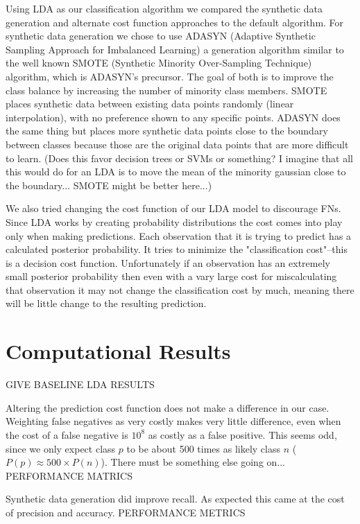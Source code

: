 \documentclass{article}
\begin{document}
Using LDA as our classification algorithm we compared the synthetic data generation and alternate cost function approaches to the default algorithm.
For synthetic data generation we chose to use ADASYN (Adaptive Synthetic Sampling Approach for Imbalanced Learning) a generation algorithm similar to the well known SMOTE (Synthetic Minority Over-Sampling Technique) algorithm, which is ADASYN's precursor.
The goal of both is to improve the class balance by increasing the number of minority class members.
SMOTE places synthetic data between existing data points randomly (linear interpolation), with no preference shown to any specific points.
ADASYN does the same thing but places more synthetic data points close to the boundary between classes because those are the original data points that are more difficult to learn.
(Does this favor decision trees or SVMs or something? I imagine that all this would do for an LDA is to move the mean of the minority gaussian close to the boundary...
SMOTE might be better here...)

We also tried changing the cost function of our LDA model to discourage FNs.
Since LDA works by creating probability distributions the cost comes into play only when making predictions.
Each observation that it is trying to predict has a calculated posterior probability.
It tries to minimize the "classification cost"--this is a decision cost function.
Unfortunately if an observation has an extremely small posterior probability then even with a vary large cost for miscalculating that observation it may not change the classification cost by much, meaning there will be little change to the resulting prediction.

\section{Computational Results}

GIVE BASELINE LDA RESULTS

Altering the prediction cost function does not make a difference in our case.
Weighting false negatives as very costly makes very little difference, even when the cost of a false negative is $10^8$ as costly as a false positive.
This seems odd, since we only expect class $p$ to be about 500 times as likely class $n$ ($P(p) \approx 500 \times P(n)$).
There must be something else going on...
PERFORMANCE MATRICS

Synthetic data generation did improve recall. As expected this came at the cost of precision and accuracy.
PERFORMANCE METRICS
\end{document}
